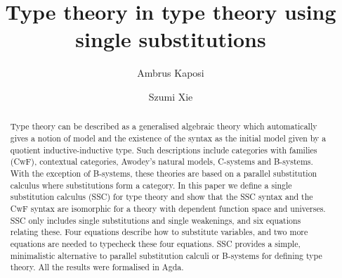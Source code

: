 \documentclass[a4paper,UKenglish,cleveref, autoref, thm-restate]{lipics-v2021}
\title{Type theory in type theory using single substitutions} %
\author{Ambrus Kaposi}{Eötvös Loránd University, Budapest}{akaposi@inf.elte.hu}{https://orcid.org/0000-0001-9897-8936}{(Optional) author-specific funding acknowledgements}%
\author{Szumi Xie}{Eötvös Loránd University, Budapest}{szumi@inf.elte.hu}{[orcid]}{}
\begin{document}
\maketitle

\begin{abstract}
Type theory can be described as a generalised algebraic theory which
automatically gives a notion of model and the existence of the syntax
as the initial model given by a quotient inductive-inductive
type. Such descriptions include categories with families (CwF),
contextual categories, Awodey's natural models, C-systems and
B-systems. With the exception of B-systems, these theories are based on
a parallel substitution calculus where substitutions form a
category. In this paper we define a single substitution calculus (SSC)
for type theory and show that the SSC syntax and the CwF syntax are
isomorphic for a theory with dependent function space and universes.
SSC only includes single substitutions and single weakenings, and six
equations relating these. Four equations describe how to substitute
variables, and two more equations are needed to typecheck these four
equations. SSC provides a simple, minimalistic alternative to parallel
substitution calculi or B-systems for defining type theory. All the
results were formalised in Agda.
\end{abstract}




\end{document}
